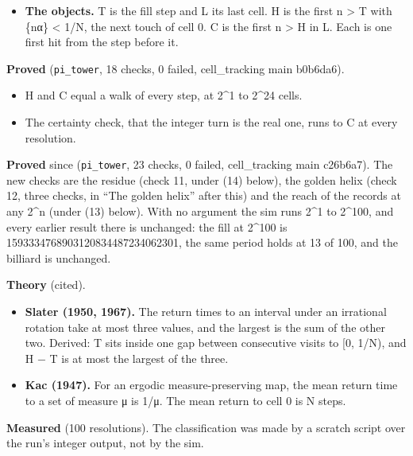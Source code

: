 \begin{itemize}
\item \textbf{The objects.} T is the fill step and L its last cell. H is the first n > T with \{nα\} < 1/N, the next touch of cell 0. C is the first n > H in L. Each is one first hit from the step before it.
\end{itemize}

\textbf{Proved} (\texttt{pi\_\allowbreak{}tower}, 18 checks, 0 failed, cell\_\allowbreak{}tracking main b0b6da6).

\begin{itemize}
\item H and C equal a walk of every step, at 2\textasciicircum{}1 to 2\textasciicircum{}24 cells.
\item The certainty check, that the integer turn is the real one, runs to C at every resolution.
\end{itemize}

\textbf{Proved} since (\texttt{pi\_\allowbreak{}tower}, 23 checks, 0 failed, cell\_\allowbreak{}tracking main c26b6a7). The new checks are the residue (check 11, under (14) below), the golden helix (check 12, three checks, in “The golden helix” after this) and the reach of the records at any 2\textasciicircum{}n (under (13) below). With no argument the sim runs 2\textasciicircum{}1 to 2\textasciicircum{}100, and every earlier result there is unchanged: the fill at 2\textasciicircum{}100 is 1593334768903120834487234062301, the same period holds at 13 of 100, and the billiard is unchanged.

\textbf{Theory} (cited).

\begin{itemize}
\item \textbf{Slater (1950, 1967).} The return times to an interval under an irrational rotation take at most three values, and the largest is the sum of the other two. Derived: T sits inside one gap between consecutive visits to [0, 1/N), and H − T is at most the largest of the three.
\item \textbf{Kac (1947).} For an ergodic measure-preserving map, the mean return time to a set of measure μ is 1/μ. The mean return to cell 0 is N steps.
\end{itemize}

\textbf{Measured} (100 resolutions). The classification was made by a scratch script over the run's integer output, not by the sim.

